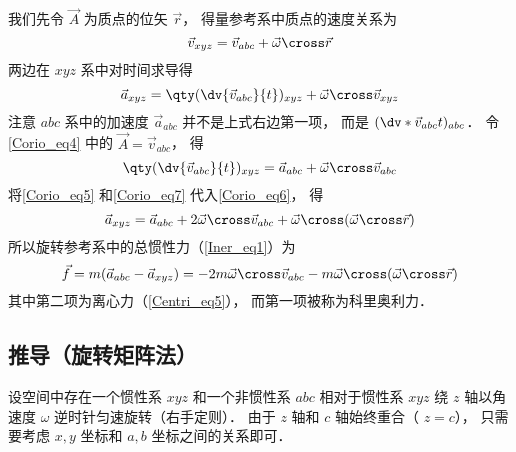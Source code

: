 我们先令 $\vec A$ 为质点的位矢 $\vec r$， 得量参考系中质点的速度关系为
\begin{equation}\label{Corio_eq5}
\vec v_{xyz} = \vec v_{abc} + \vec\omega\cross\vec r
\end{equation}
两边在 $xyz$ 系中对时间求导得
\begin{equation}\label{Corio_eq6}
\vec a_{xyz} = \qty(\dv{\vec v_{abc}}{t})_{xyz} + \vec\omega\cross\vec v_{xyz}
\end{equation}
注意 $abc$ 系中的加速度 $\vec a_{abc}$ 并不是上式右边第一项， 而是 $(\dv*{\vec v_{abc}}{t})_{abc}$． 令\autoref{Corio_eq4} 中的 $\vec A = \vec v_{abc}$， 得
\begin{equation}\label{Corio_eq7}
\qty(\dv{\vec v_{abc}}{t})_{xyz} = \vec a_{abc} + \vec\omega\cross\vec v_{abc}
\end{equation}
将\autoref{Corio_eq5} 和\autoref{Corio_eq7} 代入\autoref{Corio_eq6}， 得
\begin{equation}
\vec a_{xyz} = \vec a_{abc} + 2\vec\omega\cross\vec v_{abc} + \vec\omega\cross(\vec\omega\cross\vec r)
\end{equation}
所以旋转参考系中的总惯性力（\autoref{Iner_eq1}）为
\begin{equation}
\vec f = m(\vec a_{abc} - \vec a_{xyz}) = -2m\vec\omega\cross\vec v_{abc} - m\vec\omega\cross(\vec\omega\cross\vec r)
\end{equation}
其中第二项为离心力（\autoref{Centri_eq5}）， 而第一项被称为科里奥利力．

\subsection{推导（旋转矩阵法）}
设空间中存在一个惯性系 $xyz$ 和一个非惯性系 $abc$ 相对于惯性系 $xyz$ 绕 $z$ 轴以角速度 $\omega$ 逆时针匀速旋转（右手定则）． 由于 $z$ 轴和 $c$ 轴始终重合（ $z=c$）， 只需要考虑 $x,y$ 坐标和 $a,b$ 坐标之间的关系即可．

